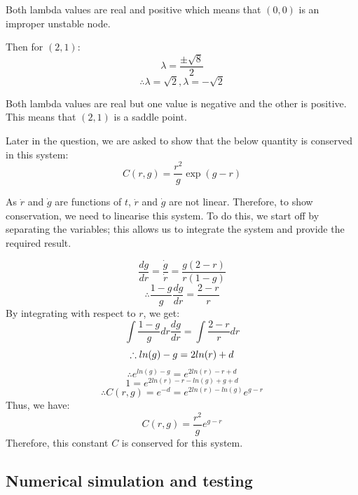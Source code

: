 \documentclass[11pt]{article}
\begin{document}
    Both lambda values are real and positive which means that $(0,0)$ is an improper unstable node.

    Then for $(2,1)$:
    \[
        \lambda = \frac{\pm\sqrt{8}}{2}
    \]
    \[
        \therefore \lambda = \sqrt{2}, \lambda = -\sqrt{2}
    \]

    Both lambda values are real but one value is negative and the other is positive. This means that $(2,1)$ is a saddle point.

    \vspace{2mm}

   Later in the question, we are asked to show that the below quantity is conserved in this system:
    \[
        C(r,g) = \frac{r^2}{g}\exp{(g-r)}
    \]


    As $\dot{r}$ and $\dot{g}$ are functions of $t$, $\dot{r}$ and $\dot{g}$ are not linear. Therefore, to show conservation, we need to linearise this system. To do this, we start off by separating the variables; this allows us to integrate the system and provide the required result.


    \[
        \frac{dg}{dr} = \frac{\dot{g}}{\dot{r}} =  \frac{g(2-r)}{r(1-g)}
    \]
    \[
        \therefore \frac{1-g}{g}\frac{dg}{dr} = \frac{2-r}{r}
    \]
    By integrating with respect to $r$, we get:
    \[
        \int\frac{1-g}{g}dr\frac{dg}{dr} = \int\frac{2-r}{r}dr
    \]
    \[
        \therefore ln(g) - g = 2ln(r) + d\\
    \]
    \[
        \therefore e^{ln(g)-g} = e^{2ln(r)-r+d}
    \]
     \[
        1 = e^{2ln(r)-r-ln(g)+g+d}
    \]
    \[
        \therefore  C(r,g)= e^{-d} = e^{2ln(r)-ln(g)}e^{g-r}
    \]
    Thus, we have:
    \[
        C(r,g) = \frac{r^2}{g}e^{g-r}
    \]
    Therefore, this constant $C$ is conserved for this system.

    \vspace{2mm}


    \subsection*{Numerical simulation and testing}
\end{document}
